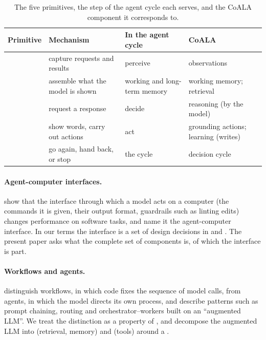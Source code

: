 \begin{table}[t]
\centering
\small
\caption{The five primitives, the step of the agent cycle each serves, and the CoALA component it corresponds to.}
\label{tab:coala}
\begin{tabularx}{\linewidth}{@{}lYYY@{}}
\toprule
Primitive & Mechanism & In the agent cycle & CoALA \\
\midrule
{} & capture requests and results & perceive & observations \\
 & assemble what the model is shown & working and long-term memory & working memory; retrieval \\
 & request a response & decide & reasoning (by the model) \\
 & show words, carry out actions & act & grounding actions; learning (writes) \\
 & go again, hand back, or stop & the cycle & decision cycle \\
\bottomrule
\end{tabularx}
\end{table}

\paragraph{Agent-computer interfaces.} \citet{yang2024sweagent} show that the interface through which a model acts on a computer (the commands it is given, their output format, guardrails such as linting edits) changes performance on software tasks, and name it the agent-computer interface. In our terms the interface is a set of design decisions in  and . The present paper asks what the complete set of components is, of which the interface is part.

\paragraph{Workflows and agents.} \citet{anthropic2024effective} distinguish workflows, in which code fixes the sequence of model calls, from agents, in which the model directs its own process, and describe patterns such as prompt chaining, routing and orchestrator--workers built on an ``augmented LLM''. We treat the distinction as a property of , and decompose the augmented LLM into  (retrieval, memory) and  (tools) around a .

